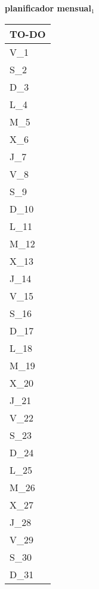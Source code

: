 \clearpage
\raggedright{
	\fontsize{25}{50}\selectfont
	\textbf{\NextYear}
}\scriptsize{\textbf{planificador mensual$_1$}}\\[11.3pt]



	\noindent\dotfill
	\renewcommand{\arraystretch}{1.5}\scriptsize
		\begin{longtabu} to \textwidth { X[l]}
		\centering \small{\textbf{TO-DO}} \\
		\toprule
		V_{1} \dotfill\\
		S_{2} \dotfill\\
		D_{3} \dotfill\\
		\hline
		L_{4} \dotfill\\
		M_{5} \dotfill\\
		X_{6} \dotfill\\
		J_{7} \dotfill\\
		V_{8} \dotfill\\
		S_{9} \dotfill\\
		D_{10} \dotfill\\
		\hline
		L_{11} \dotfill\\
		M_{12} \dotfill\\
		X_{13} \dotfill\\
		J_{14} \dotfill\\
		V_{15} \dotfill\\
		S_{16} \dotfill\\
		D_{17} \dotfill\\
		\hline
		L_{18} \dotfill\\
		M_{19} \dotfill\\
		X_{20} \dotfill\\
		J_{21} \dotfill\\
		V_{22} \dotfill\\
		S_{23} \dotfill\\
		D_{24} \dotfill\\
		\hline
		L_{25} \dotfill\\
		M_{26} \dotfill\\
		X_{27} \dotfill\\
		J_{28} \dotfill\\
		V_{29} \dotfill\\
		S_{30} \dotfill\\
		D_{31} \dotfill\\

		\bottomrule

	\end{longtabu}


\clearpage

